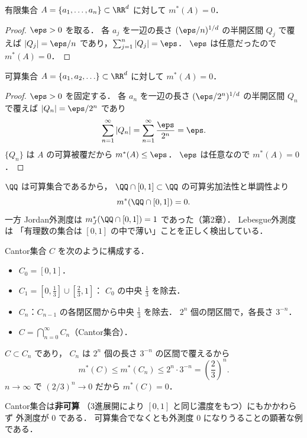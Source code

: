 \begin{example}[有限集合]\label{ex:finite-null}
有限集合 $A = \{a_1,\ldots,a_n\} \subset \RR^d$ に対して $m^*(A) = 0$．
\end{example}
\begin{proof}
$\eps > 0$ を取る．
各 $a_j$ を一辺の長さ $(\eps/n)^{1/d}$ の半開区間 $Q_j$ で覆えば
$|Q_j| = \eps/n$ であり，$\sum_{j=1}^n |Q_j| = \eps$．
$\eps$ は任意だったので $m^*(A) = 0$．
\end{proof}

\begin{example}[可算集合]\label{ex:countable-null}
可算集合 $A = \{a_1, a_2, \ldots\} \subset \RR^d$ に対して $m^*(A) = 0$．
\end{example}
\begin{proof}
$\eps > 0$ を固定する．
各 $a_n$ を一辺の長さ $(\eps/2^n)^{1/d}$ の半開区間 $Q_n$ で覆えば
$|Q_n| = \eps/2^n$ であり
\[
\sum_{n=1}^{\infty} |Q_n| = \sum_{n=1}^{\infty} \frac{\eps}{2^n} = \eps.
\]
$\{Q_n\}$ は $A$ の可算被覆だから $m^*(A) \le \eps$．
$\eps$ は任意なので $m^*(A) = 0$．
\end{proof}

\begin{example}\label{ex:rationals-outer}
$\QQ$ は可算集合であるから，
$\QQ \cap [0,1] \subset \QQ$ の可算劣加法性と単調性より
\[
m^*(\QQ \cap [0,1]) = 0.
\]
一方 Jordan外測度は $m_J^*(\QQ \cap [0,1]) = 1$ であった（第2章）．
Lebesgue外測度は
「有理数の集合は $[0,1]$ の中で薄い」ことを正しく検出している．
\end{example}

\begin{example}[Cantor集合]\label{ex:cantor-outer}
Cantor集合 $C$ を次のように構成する．
\begin{itemize}
\item $C_0 = [0,1]$．
\item $C_1 = [0,\frac{1}{3}] \cup [\frac{2}{3},1]$：
$C_0$ の中央 $\frac{1}{3}$ を除去．
\item $C_n$：$C_{n-1}$ の各閉区間から中央 $\frac{1}{3}$ を除去．
$2^n$ 個の閉区間で，各長さ $3^{-n}$．
\item $C = \bigcap_{n=0}^{\infty} C_n$（Cantor集合）．
\end{itemize}
$C \subset C_n$ であり，
$C_n$ は $2^n$ 個の長さ $3^{-n}$ の区間で覆えるから
\[
m^*(C) \le m^*(C_n) \le 2^n \cdot 3^{-n} = \left(\frac{2}{3}\right)^n.
\]
$n \to \infty$ で $(2/3)^n \to 0$ だから $m^*(C) = 0$．

Cantor集合は\textbf{非可算}
（3進展開により $[0,1]$ と同じ濃度をもつ）にもかかわらず
外測度が $0$ である．
可算集合でなくとも外測度 $0$ になりうることの顕著な例である．
\end{example}

